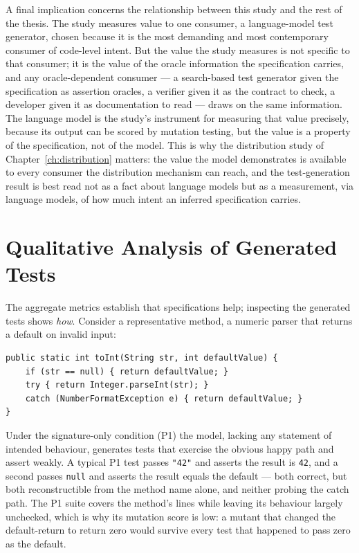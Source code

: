 A final implication concerns the relationship between this study and the rest of
the thesis. The study measures value to one consumer, a language-model test
generator, chosen because it is the most demanding and most contemporary consumer
of code-level intent. But the value the study measures is not specific to that
consumer; it is the value of the oracle information the specification carries, and
any oracle-dependent consumer --- a search-based test generator given the
specification as assertion oracles, a verifier given it as the contract to check, a
developer given it as documentation to read --- draws on the same information. The
language model is the study's instrument for measuring that value precisely,
because its output can be scored by mutation testing, but the value is a property of
the specification, not of the model. This is why the distribution study of
Chapter~\ref{ch:distribution} matters: the value the model demonstrates is available
to every consumer the distribution mechanism can reach, and the test-generation
result is best read not as a fact about language models but as a measurement, via
language models, of how much intent an inferred specification carries.

\section{Qualitative Analysis of Generated Tests}
\label{sec:tg-qualitative}

The aggregate metrics establish that specifications help; inspecting the
generated tests shows \emph{how}. Consider a representative method, a numeric
parser that returns a default on invalid input:

\begin{lstlisting}
public static int toInt(String str, int defaultValue) {
    if (str == null) { return defaultValue; }
    try { return Integer.parseInt(str); }
    catch (NumberFormatException e) { return defaultValue; }
}
\end{lstlisting}

Under the signature-only condition (P1) the model, lacking any statement of
intended behaviour, generates tests that exercise the obvious happy path and
assert weakly. A typical P1 test passes \texttt{"42"} and asserts the result is
\texttt{42}, and a second passes \texttt{null} and asserts the result equals the
default --- both correct, but both reconstructible from the method name alone,
and neither probing the catch path. The P1 suite covers the method's lines while
leaving its behaviour largely unchecked, which is why its mutation score is low:
a mutant that changed the default-return to return zero would survive every test
that happened to pass zero as the default.

